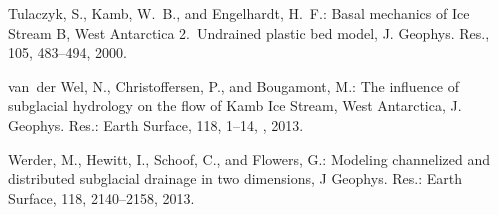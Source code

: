 \documentclass[11pt,reqno]{amsart}
\begin{document}
\begin{thebibliography}{}
Tulaczyk, S., Kamb, W.~B., and Engelhardt, H.~F.: Basal mechanics of {I}ce
  {S}tream {B}, {W}est {A}ntarctica 2.~{U}ndrained plastic bed model, J.
  Geophys. Res., 105, 483--494, 2000{}.

van~der Wel, N., Christoffersen, P., and Bougamont, M.: The influence of
  subglacial hydrology on the flow of {K}amb {I}ce {S}tream, {W}est
  {A}ntarctica, J. Geophys. Res.: Earth Surface, 118, 1--14,
  , 2013.

Werder, M., Hewitt, I., Schoof, C., and Flowers, G.: Modeling channelized and
  distributed subglacial drainage in two dimensions, J Geophys. Res.: Earth
  Surface, 118, 2140--2158, 2013.
\end{thebibliography}
\end{document}
